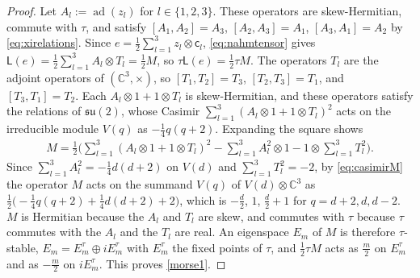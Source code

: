 \documentclass [leqno, 10pt]{amsart}
\theoremstyle{definition}
\numberwithin{equation}{section}
\newcommand{\lin}{\mathsf{L}}
\newcommand{\su}{\mathfrak{su}}
\newcommand{\ad}{\operatorname{ad}}
\newcommand{\com}{\mathbb C}
\begin{document}
\begin{proof}
Let $A_{l} := \ad(z_{l})$ for $l \in \{1, 2, 3\}$. These operators are skew-Hermitian, commute with $\tau$, and satisfy $[A_{1}, A_{2}] = A_{3}$, $[A_{2}, A_{3}] = A_{1}$, $[A_{3}, A_{1}] = A_{2}$ by \eqref{eq:xirelations}. Since $e = \tfrac{1}{2}\sum_{l=1}^{3}z_{l} \otimes \mathsf{c}_{l}$, \eqref{eq:nahmtensor} gives $\lin(e) = \tfrac{1}{2}\sum_{l=1}^{3}A_{l} \otimes T_{l} = \tfrac{1}{2}M$, so $\tau\lin(e) = \tfrac{1}{2}\tau M$. The operators $T_{l}$ are the adjoint operators of $(\com^{3}, \times)$, so $[T_{1}, T_{2}] = T_{3}$, $[T_{2}, T_{3}] = T_{1}$, and $[T_{3}, T_{1}] = T_{2}$. Each $A_{l} \otimes 1 + 1 \otimes T_{l}$ is skew-Hermitian, and these operators satisfy the relations of $\su(2)$, whose Casimir $\sum_{l=1}^{3}(A_{l} \otimes 1 + 1 \otimes T_{l})^{2}$ acts on the irreducible module $V(q)$ as $-\tfrac{1}{4}q(q+2)$. Expanding the square shows
\begin{align}\label{eq:casimirM}
M = \tfrac{1}{2}\Big(\sum_{l=1}^{3}(A_{l} \otimes 1 + 1 \otimes T_{l})^{2} - \sum_{l=1}^{3}A_{l}^{2}\otimes 1 - 1 \otimes \sum_{l=1}^{3}T_{l}^{2}\Big).
\end{align}
Since $\sum_{l=1}^{3}A_{l}^{2} = -\tfrac{1}{4}d(d+2)$ on $V(d)$ and $\sum_{l=1}^{3}T_{l}^{2} = -2$, by \eqref{eq:casimirM} the operator $M$ acts on the summand $V(q)$ of $V(d) \otimes \com^{3}$ as $\tfrac{1}{2}\big(-\tfrac{1}{4}q(q+2) + \tfrac{1}{4}d(d+2) + 2\big)$, which is $-\tfrac{d}{2}$, $1$, $\tfrac{d}{2}+1$ for $q = d+2, d, d-2$. $M$ is Hermitian because the $A_{l}$ and $T_{l}$ are skew, and commutes with $\tau$ because $\tau$ commutes with the $A_{l}$ and the $T_{l}$ are real. An eigenspace $E_{m}$ of $M$ is therefore $\tau$-stable, $E_{m} = E_{m}^{\tau} \oplus iE_{m}^{\tau}$ with $E_{m}^{\tau}$ the fixed points of $\tau$, and $\tfrac{1}{2}\tau M$ acts as $\tfrac{m}{2}$ on $E_{m}^{\tau}$ and as $-\tfrac{m}{2}$ on $iE_{m}^{\tau}$. This proves \ref{morse1}.


\end{proof}
\end{document}
